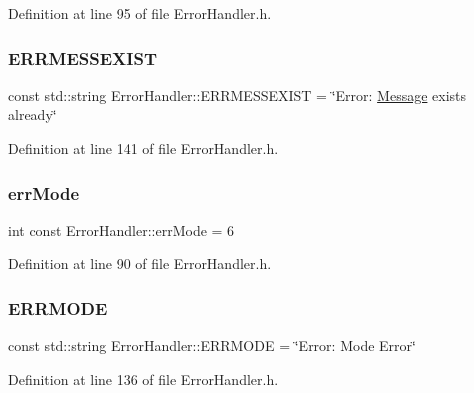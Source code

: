 Definition at line 95 of file Error\+Handler.\+h.

\mbox{\label{classErrorHandler_a8abcac399b5014dad5f8d728298489e3}} 
\subsubsection{\texorpdfstring{ERRMESSEXIST}{ERRMESSEXIST}}
{\footnotesize\ttfamily const std\+::string Error\+Handler\+::\+E\+R\+R\+M\+E\+S\+S\+E\+X\+I\+ST = \char`\"{}Error\+: \mbox{\hyperlink{classMessage}{Message}} exists already\char`\"{}\hspace{0.3cm}{\ttfamily [static]}}



Definition at line 141 of file Error\+Handler.\+h.

\mbox{\label{classErrorHandler_a1ec0cf275df16d2fe2641cc29c0f2ff0}} 
\subsubsection{\texorpdfstring{errMode}{errMode}}
{\footnotesize\ttfamily int const Error\+Handler\+::err\+Mode = 6\hspace{0.3cm}{\ttfamily [static]}}



Definition at line 90 of file Error\+Handler.\+h.

\mbox{\label{classErrorHandler_a88183b288608b1f8c54c84a27d5f6a40}} 
\subsubsection{\texorpdfstring{ERRMODE}{ERRMODE}}
{\footnotesize\ttfamily const std\+::string Error\+Handler\+::\+E\+R\+R\+M\+O\+DE = \char`\"{}Error\+: Mode Error\char`\"{}\hspace{0.3cm}{\ttfamily [static]}}



Definition at line 136 of file Error\+Handler.\+h.

\mbox{\label{classErrorHandler_aeb08094d2754a72bdaf44a80c77d4189}} 
